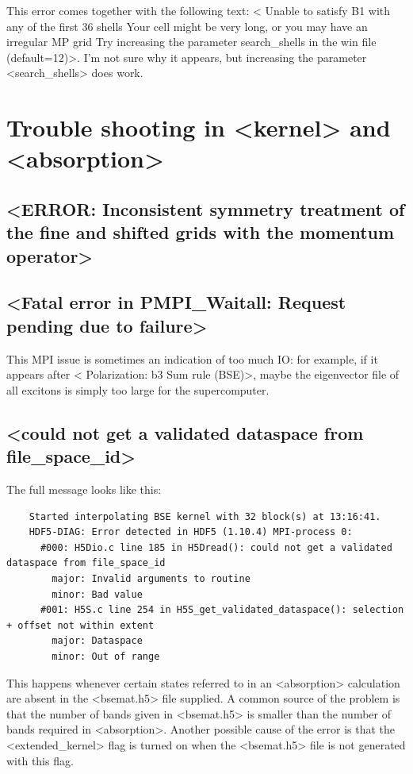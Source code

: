 \documentclass[hyperref, a4paper, 12pt]{report}
\def\texttt#1{<#1>}%
\newcommand{\shortcode}[1]{\texttt{#1}}
\begin{document}
This error comes together with the following text:
\shortcode{ Unable to satisfy B1 with any of the first  36 shells
Your cell might be very long, or you may have an irregular MP grid
Try increasing the parameter search_shells in the win file (default=12)}.
I'm not sure why it appears, but increasing the parameter \shortcode{search_shells} does work.

\section{Trouble shooting in \shortcode{kernel} and \shortcode{absorption}}

\subsection{\shortcode{ERROR: Inconsistent symmetry treatment of the fine and shifted grids with the momentum operator}}

\subsection{\shortcode{Fatal error in PMPI_Waitall: Request pending due to failure}}

This MPI issue is sometimes an indication of too much IO: 
for example, if it appears after \shortcode{ Polarization: b3 Sum rule (BSE)}, 
maybe the eigenvector file of all excitons 
is simply too large for the supercomputer. 

\subsection{\shortcode{could not get a validated dataspace from file_space_id}}

The full message looks like this: 
\begin{lstlisting}
    Started interpolating BSE kernel with 32 block(s) at 13:16:41.
    HDF5-DIAG: Error detected in HDF5 (1.10.4) MPI-process 0:
      #000: H5Dio.c line 185 in H5Dread(): could not get a validated dataspace from file_space_id
        major: Invalid arguments to routine
        minor: Bad value
      #001: H5S.c line 254 in H5S_get_validated_dataspace(): selection + offset not within extent
        major: Dataspace
        minor: Out of range
\end{lstlisting}
This happens whenever certain states referred to in an \shortcode{absorption} calculation
are absent in the \shortcode{bsemat.h5} file supplied.
A common source of the problem is that the number of bands given in \shortcode{bsemat.h5} 
is smaller than the number of bands required in \shortcode{absorption}.
Another possible cause of the error is that the \shortcode{extended_kernel} flag
is turned on when the \shortcode{bsemat.h5} file is not generated with this flag.
\end{document}
